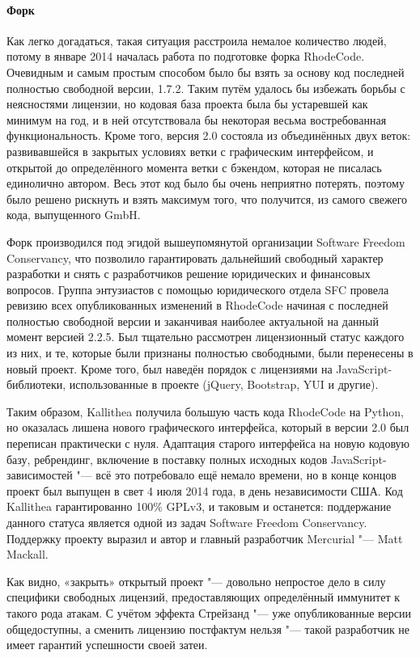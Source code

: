\documentclass[10pt, a5paper]{article}
\begin{document}
\paragraph{Форк}

Как легко догадаться, такая ситуация расстроила немалое количество людей, потому в январе 2014 началась работа по подготовке форка RhodeCode. Очевидным и самым простым способом было бы взять за основу код последней полностью свободной версии, 1.7.2. Таким путём удалось бы избежать борьбы с неясностями лицензии, но кодовая база проекта была бы устаревшей как минимум на год, и в ней отсутствовала бы некоторая весьма востребованная функциональность. Кроме того, версия 2.0 состояла из объединённых двух веток: развивавшейся в закрытых условиях ветки с графическим интерфейсом, и открытой до определённого момента ветки с бэкендом, которая не писалась единолично автором. Весь этот код было бы очень неприятно потерять, поэтому было решено рискнуть и взять максимум того, что получится, из самого свежего кода, выпущенного GmbH.

Форк производился под эгидой вышеупомянутой организации Software Freedom Conservancy, что позволило гарантировать дальнейший свободный характер разработки и снять с разработчиков решение юридических и финансовых вопросов. Группа энтузиастов с помощью юридического отдела SFC провела ревизию всех опубликованных изменений в RhodeCode начиная с последней полностью свободной версии и заканчивая наиболее актуальной на данный момент версией 2.2.5. Был тщательно рассмотрен лицензионный статус каждого из них, и те, которые были признаны полностью свободными, были перенесены в новый проект. Кроме того, был наведён порядок с лицензиями на JavaScript-библиотеки, использованные в проекте (jQuery, Bootstrap, YUI и другие).

Таким образом, Kallithea получила большую часть кода RhodeCode на Python, но оказалась лишена нового графического интерфейса, который в версии 2.0 был переписан практически с нуля. Адаптация старого интерфейса на новую кодовую базу, ребрендинг, включение в поставку полных исходных кодов JavaScript-зависимостей "--- всё это потребовало ещё немало времени, но в конце концов проект был выпущен в свет 4 июля 2014 года, в день независимости США. Код Kallithea гарантированно 100\% GPLv3, и таковым и останется: поддержание данного статуса является одной из задач Software Freedom Conservancy. Поддержку проекту выразил и автор и главный разработчик Mercurial "--- Matt Mackall.

Как видно, «закрыть» открытый проект "--- довольно непростое дело в силу специфики свободных лицензий, предоставляющих определённый иммунитет к такого рода атакам. С учётом эффекта Стрейзанд "--- уже опубликованные версии общедоступны, а сменить лицензию постфактум нельзя "--- такой разработчик не имеет гарантий успешности своей затеи.
\end{document}
